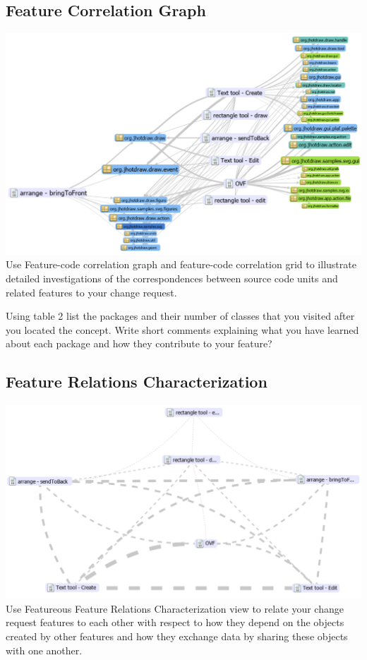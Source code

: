 \subsection{Feature Correlation Graph}
\includegraphics[width=\textwidth]{Images/featureousgraph.png}
Use Feature-code correlation graph and feature-code correlation grid to illustrate detailed investigations of the correspondences between source code units and related features to your change request.

Using table 2 list the packages and their number of classes that you visited after you located the concept. Write short comments explaining what you have learned about each package and how they contribute to your feature?
\subsection{Feature Relations Characterization}
\includegraphics[width=\textwidth]{Images/featureousrelations.png}
Use Featureous Feature Relations Characterization view to relate your change request features to each other with respect to how they depend on the objects created by other features and how they exchange data by sharing these objects with one another.
